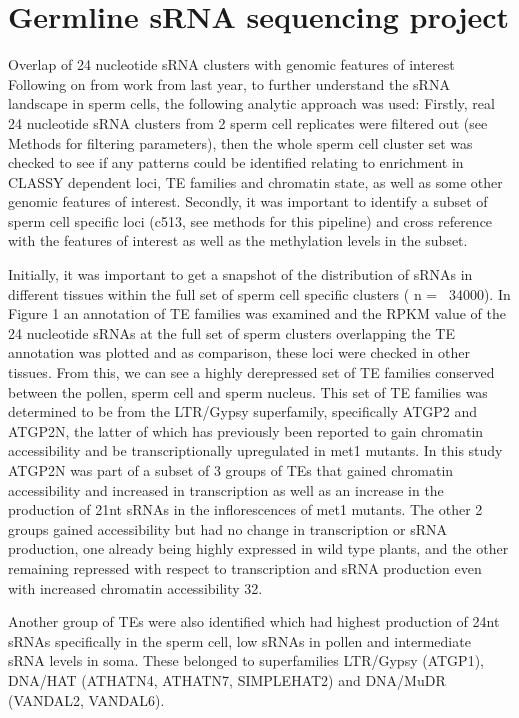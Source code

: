 \section{Germline sRNA sequencing project}

Overlap of 24 nucleotide sRNA clusters with genomic features of interest
Following on from work from last year, to further understand the sRNA landscape in sperm cells, the following analytic approach was used: Firstly, real 24 nucleotide sRNA clusters from 2 sperm cell replicates were filtered out (see Methods for filtering parameters), then the whole sperm cell cluster set was checked to see if any patterns could be identified relating to enrichment in CLASSY dependent loci, TE families and chromatin state, as well as some other genomic features of interest. Secondly, it was important to identify a subset of sperm cell specific loci (c513, see methods for this pipeline) and cross reference with the features of interest as well as the methylation levels in the subset.

Initially, it was important to get a snapshot of the distribution of sRNAs in different tissues within the full set of sperm cell specific clusters ( n = ~34000). In Figure 1 an annotation of TE families was examined and the RPKM value of the 24 nucleotide sRNAs at the full set of sperm clusters overlapping the TE annotation was plotted and as comparison, these loci were checked in other tissues. From this, we can see a highly derepressed set of TE families conserved between the pollen, sperm cell and sperm nucleus. This set of TE families was determined to be from the LTR/Gypsy superfamily, specifically ATGP2 and ATGP2N, the latter of which has previously been reported to gain chromatin accessibility and be transcriptionally upregulated in met1 mutants. In this study ATGP2N was part of a subset of 3 groups of TEs that gained chromatin accessibility and increased in transcription as well as an increase in the production of 21nt sRNAs in the inflorescences of met1 mutants. The other 2 groups gained accessibility but had no change in transcription or sRNA production, one already being highly expressed in wild type plants, and the other remaining repressed with respect to transcription and sRNA production even with increased chromatin accessibility 32.

Another group of TEs were also identified which had highest production of 24nt sRNAs specifically in the sperm cell, low sRNAs in pollen and intermediate sRNA levels in soma. These belonged to superfamilies LTR/Gypsy (ATGP1), DNA/HAT (ATHATN4, ATHATN7, SIMPLEHAT2) and DNA/MuDR (VANDAL2, VANDAL6).


